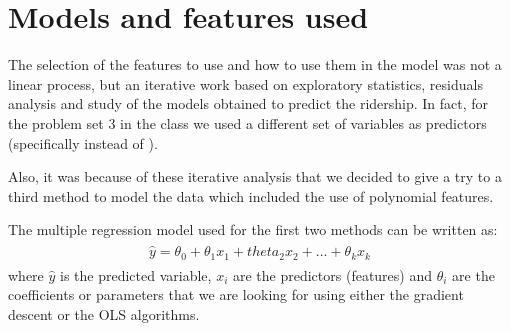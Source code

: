 \documentclass[a4paper,12pt,english]{sphinxmanual}
\begin{document}
\section{Models and features used}
\label{section2:models-and-features-used}
The selection of the features to use and how to use them in the model was not
a linear process, but an iterative work based on exploratory statistics, residuals
analysis and study of the models obtained to predict the ridership. In fact,
for the problem set 3 in the class we used a different set of variables as
predictors (specifically  instead of ).

Also, it was because of these iterative analysis that we decided to give a try
to a third method to model the data which included the use of polynomial
features.

The multiple regression model used for the first two methods can be written as:
\label{section2:multreg-mod}\label{section2:equation-multreg_mod}\begin{gather}
\begin{split}\hat y = \theta_0 + \theta_1 x_1 + theta_2 x_2 + ... + \theta_k x_k\end{split}\label{section2-multreg_mod}
\end{gather}
where \(\hat y\) is the predicted variable, \(x_i\) are the predictors
(features) and \(\theta_i\) are the coefficients or parameters that we are
looking for using either the gradient descent or the OLS algorithms.
\end{document}
